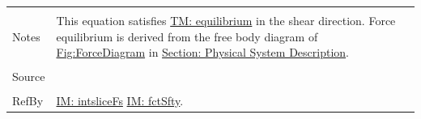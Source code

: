 \documentclass[12pt]{article}
\begin{document}
\begin{minipage}{\textwidth}
\begin{tabular}{p{} p{}}
                                 \\ \midrule \\
                                 Notes & This equation satisfies \hyperref[TM:equilibrium]{TM: equilibrium} in the shear direction. Force equilibrium is derived from the free body diagram of \hyperref[Figure:ForceDiagram]{Fig:ForceDiagram} in \hyperref[Sec:PhysSyst]{Section: Physical System Description}.
                                         \\ \midrule \\
                                         Source & \cite{chen2005}
                                                  \\ \midrule \\
                                                  RefBy & \hyperref[IM:intsliceFs]{IM: intsliceFs} \hyperref[IM:fctSfty]{IM: fctSfty}.
\\ \bottomrule \end{tabular}
\end{minipage}
\par~
\end{document}
